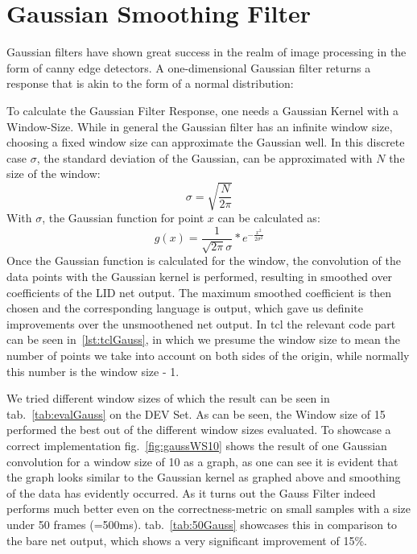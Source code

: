 \section{Gaussian Smoothing Filter}
\label{sec:eval:GSF}
Gaussian filters have shown great success in the realm of image processing in the form of canny edge detectors. 
A one-dimensional Gaussian filter returns a response that is akin to the form of a normal distribution:
\begin{figure}[h!]
\centering
{}
\end{figure}
To calculate the Gaussian Filter Response, one needs a Gaussian Kernel with a Window-Size. While in general the Gaussian filter has an infinite window size, choosing a fixed window size can approximate the Gaussian well. In this discrete case \(\sigma\), the standard deviation of the Gaussian, can be approximated with \(N\) the size of the window:
\begin{equation}
\sigma  =\sqrt{\frac{N}{2\pi}}
\end{equation}
With \(\sigma\), the Gaussian function for point \(x\) can be calculated as:
\begin{equation}
g(x) = \frac{1}{\sqrt{2\pi}\sigma} * e^{{- \frac{x^2}{2\sigma^2}}}
\end{equation}
Once the Gaussian function is calculated for the window, the convolution of the data points with the Gaussian kernel is performed, resulting in smoothed over coefficients of the LID net output. The maximum smoothed coefficient is then chosen and the corresponding language is output, which gave us definite improvements over the unsmoothened net output. In tcl the relevant code part can be seen in~\ref{lst:tclGauss}, in which we presume the window size to mean the number of points we take into account on both sides of the origin, while normally this number is the window size - 1.


We tried different window sizes of which the result can be seen in tab.~\ref{tab:evalGauss} on the DEV Set.  As can be seen, the Window size of 15 performed the best out of the different window sizes evaluated. To showcase a correct implementation fig.~\ref{fig:gaussWS10} shows the result of one Gaussian convolution for a window size of 10 as a graph, as one can see it is evident that the graph looks similar to the Gaussian kernel as graphed above and smoothing of the data has evidently occurred.  As it turns out the Gauss Filter indeed performs much better even on the correctness-metric on small samples with a size under 50 frames (=500ms). tab.~\ref{tab:50Gauss} showcases this in comparison to the bare net output, which shows a very significant improvement of 15\%.

